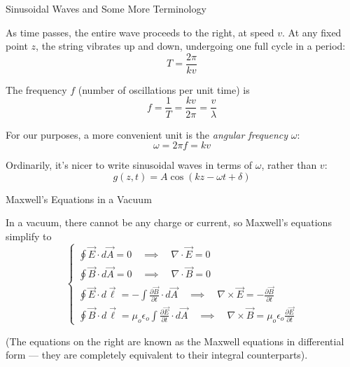\documentclass{beamer}
\begin{document}
\begin{frame}{Sinusoidal Waves and Some More Terminology}

As time passes, the entire wave proceeds to the right, at speed $v$. At any fixed point $z$, the string vibrates up and down, undergoing one full cycle in a period:
\begin{equation*}
	T = \frac{2\pi}{kv}
\end{equation*}

The frequency $f$ (number of oscillations per unit time) is
\begin{equation*}
	f = \frac{1}{T} = \frac{kv}{2\pi} = \frac{v}{\lambda}
\end{equation*}

For our purposes, a more convenient unit is the \emph{angular frequency} $\omega$:
\begin{equation*}
	\omega = 2\pi f = kv
\end{equation*}

Ordinarily, it's nicer to write sinusoidal waves in terms of $\omega$, rather than $v$:
\begin{equation*}
	g(z,t) = A \cos{\left( kz - \omega t + \delta \right)}
\end{equation*}

\end{frame}

\begin{frame}{Maxwell's Equations in a Vacuum}

In a vacuum, there cannot be any charge or current, so Maxwell's equations simplify to
\begin{equation*}
    \begin{cases} \displaystyle \oint \vec{E} \cdot d\vec{A} = 0 \quad \implies \quad \nabla \cdot \vec{E} = 0 \\[1.0em] \displaystyle \oint \vec{B} \cdot d\vec{A} = 0 \quad \implies \quad \nabla \cdot \vec{B} = 0 \\[1.0em] \displaystyle \oint \vec{E} \cdot d\vec{\ell} = - \int \frac{\partial \vec{B}}{\partial t} \cdot d\vec{A} \quad \implies \quad \nabla \times \vec{E} = -\frac{\partial \vec{B}}{\partial t} \\[1.0em] \displaystyle \oint \vec{B} \cdot d\vec{\ell} = \mu_o \epsilon_o \int \frac{\partial \vec{E}}{\partial t} \cdot d\vec{A} \quad \implies \quad \nabla \times \vec{B} = \mu_o \epsilon_o \frac{\partial \vec{E}}{\partial t} \end{cases}
\end{equation*}

(The equations on the right are known as the Maxwell equations in differential form --- they are completely equivalent to their integral counterparts).

\end{frame}
\end{document}
